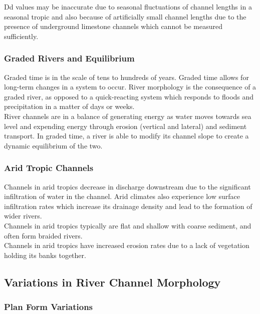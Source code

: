 \documentclass[../../main]{subfiles}
\begin{document}
	Dd values may be inaccurate due to seasonal fluctuations of channel lengths in a seasonal tropic and also because of artificially small channel lengths due to the presence of underground limestone channels which cannot be measured sufficiently.

\subsubsection{Graded Rivers and Equilibrium}

	Graded time is in the scale of tens to hundreds of years. Graded time allows for long-term changes in a system to occur. River morphology is the consequence of a graded river, as opposed to a quick-reacting system which responds to floods and precipitation in a matter of days or weeks. \\

	River channels are in a balance of generating energy as water moves towards sea level and expending energy through erosion (vertical and lateral) and sediment transport. In graded time, a river is able to modify its channel slope to create a dynamic equilibrium of the two.

\subsubsection{Arid Tropic Channels}
	
	Channels in arid tropics decrease in discharge downstream due to the significant infiltration of water in the channel. Arid climates also experience low surface infiltration rates which increase its drainage density and lead to the formation of wider rivers. \\

	Channels in arid tropics typically are flat and shallow with coarse sediment, and often form braided rivers. \\

	Channels in arid tropics have increased erosion rates due to a lack of vegetation holding its banks together.

\subsection{Variations in River Channel Morphology}

\subsubsection{Plan Form Variations}
\end{document}
